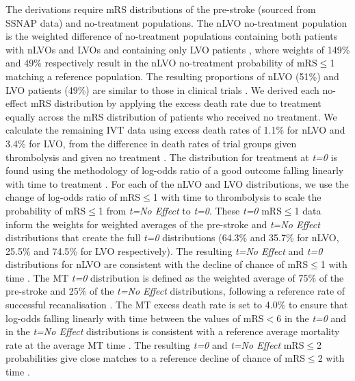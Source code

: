 The derivations require mRS distributions of the pre-stroke (sourced from SSNAP data) and no-treatment populations. The nLVO no-treatment population is the weighted difference of no-treatment populations containing both patients with nLVOs and LVOs \cite{lees_time_2010} and containing only LVO patients \cite{goyal_endovascular_2016}, where weights of 149\% and 49\% respectively result in the nLVO no-treatment probability of mRS$\leq$1 matching a reference population\cite{emberson_effect_2014}. The resulting proportions of nLVO (51\%) and LVO patients (49\%) are similar to those in clinical trials \cite{ist-3_collaborative_group_benefits_2012, emberson_effect_2014}. We derived each no-effect mRS distribution by applying the excess death rate due to treatment equally across the mRS distribution of patients who received no treatment. We calculate the remaining IVT data using excess death rates of 1.1\% for nLVO and 3.4\% for LVO, from the difference in death rates of trial groups given thrombolysis and given no treatment \cite{emberson_effect_2014}. The distribution for treatment at \emph{t=0} is found using the methodology of log-odds ratio of a good outcome falling linearly with time to treatment \cite{emberson_effect_2014, fransen_time_2016}. For each of the nLVO and LVO distributions, we use the change of log-odds ratio of mRS$\leq$1 with time to thrombolysis \cite{emberson_effect_2014} to scale the probability of mRS$\leq$1 from \emph{t=No Effect} to \emph{t=0}. These \emph{t=0} mRS$\leq$1 data inform the weights for weighted averages of the pre-stroke and \emph{t=No Effect} distributions that create the full \emph{t=0} distributions (64.3\% and 35.7\% for nLVO, 25.5\% and 74.5\% for LVO respectively). The resulting \emph{t=No Effect} and \emph{t=0} distributions for nLVO are consistent with the decline of chance of mRS$\leq$1 with time \cite{holodinsky_modeling_2018}. The MT \emph{t=0} distribution is defined as the weighted average of 75\% of the pre-stroke and 25\% of the \emph{t=No Effect} distributions, following a reference rate of successful recanalisation \cite{hui_efficacy_2020}. The MT excess death rate is set to 4.0\% to ensure that log-odds falling linearly with time between the values of mRS$<$6 in the \emph{t=0} and in the \emph{t=No Effect} distributions is consistent with a reference average mortality rate at the average MT time \cite{goyal_endovascular_2016}. The resulting \emph{t=0} and \emph{t=No Effect} mRS$\leq$2 probabilities give close matches to a reference decline of chance of mRS$\leq$2 with time \cite{fransen_time_2016}.

